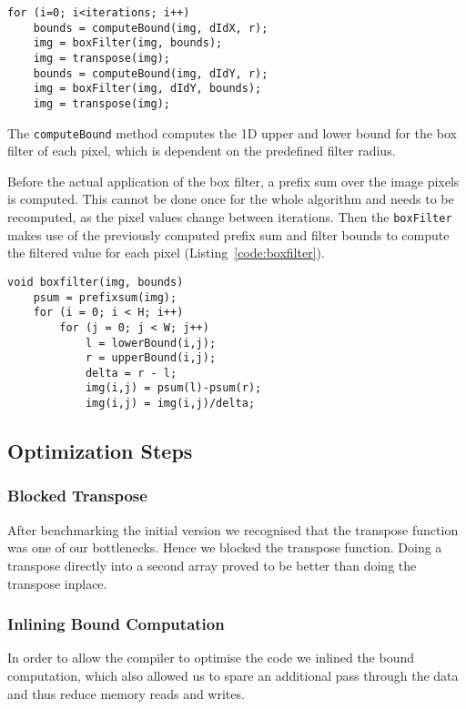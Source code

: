 \begin{lstlisting}[caption=Filterstep,label=code:filterstep]
for (i=0; i<iterations; i++)
    bounds = computeBound(img, dIdX, r);
    img = boxFilter(img, bounds);
    img = transpose(img);
    bounds = computeBound(img, dIdY, r);
    img = boxFilter(img, dIdY, bounds);
    img = transpose(img);
\end{lstlisting}

The \lstinline{computeBound} method computes the 1D upper and lower bound for the box filter of each pixel, which is dependent on the predefined filter radius. 

Before the actual application of the box filter, a prefix sum over the image pixels is computed. This cannot be done once for the whole algorithm and needs to be recomputed, as the pixel values change between iterations. Then the \lstinline{boxFilter} makes use of the previously computed prefix sum and filter bounds to compute the filtered value for each pixel (Listing~\ref{code:boxfilter}).

\begin{lstlisting}[caption=Boxfilter step, label=code:boxfilter]
void boxfilter(img, bounds) 
    psum = prefixsum(img);
    for (i = 0; i < H; i++) 
        for (j = 0; j < W; j++)
            l = lowerBound(i,j);
            r = upperBound(i,j);
            delta = r - l;
            img(i,j) = psum(l)-psum(r);
            img(i,j) = img(i,j)/delta;
\end{lstlisting}

\subsection{Optimization Steps}

\subsubsection{Blocked Transpose}

After benchmarking the initial version we recognised that the transpose function was one of our bottlenecks. Hence we blocked the transpose function. Doing a transpose directly into a second array proved to be better than doing the transpose inplace.

\subsubsection{Inlining Bound Computation}

In order to allow the compiler to optimise the code we inlined the bound computation, which also allowed us to spare an additional pass through the data and thus reduce memory reads and writes.


